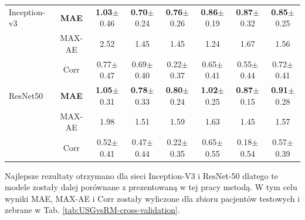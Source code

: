 \begin{table}[h]
\begin{tabular}{lc||c|c|c|c|c|c}
		Inception-v3 & \textbf{MAE} & \textbf{1.03}$\pm$0.46 & \textbf{0.70}$\pm$0.24 & \textbf{0.76}$\pm$0.26 & \textbf{0.86}$\pm$0.19 & \textbf{0.87}$\pm$0.32 & \textbf{0.85}$\pm$0.25  \\
		& MAX-AE & 2.52 & 1.45 & 1.45 & 1.24 & 1.67 & 1.56 \\ 
		& Corr & 0.77$\pm${0.47} & 0.69$\pm${0.40} & 0.22$\pm${0.37} & 0.65$\pm${0.41} & 0.55$\pm${0.44} & 0.72$\pm${0.41} \\ \hline
		ResNet50 & \textbf{MAE} & \textbf{1.05}$\pm$0.31 & \textbf{0.78}$\pm$0.33 & \textbf{0.80}$\pm$0.24 & \textbf{1.02}$\pm$0.25 & \textbf{0.87}$\pm$0.15 & \textbf{0.91}$\pm$0.28 \\
		& MAX-AE & 1.98 & 1.51 & 1.59 & 1.63 & 1.45 & 1.57 \\
		& Corr & 0.52$\pm${0.41} & 0.47$\pm${0.44} & 0.22$\pm${0.35} & 0.65$\pm${0.55} & 0.18$\pm${0.54} & 0.57$\pm${0.39} \\ \hline \hline
	\end{tabular}
	\vspace{-0.5cm}
\end{table}

Najlepsze rezultaty otrzymano dla sieci Inception-V3 i ResNet-50 dlatego te modele zostały dalej porównane z prezentowaną w tej pracy metodą. W tym celu wyniki MAE, MAX-AE i Corr zostały wyliczone dla zbioru pacjentów testowych i zebrane w Tab. \ref{tab:USGvsRM-cross-validation}.


